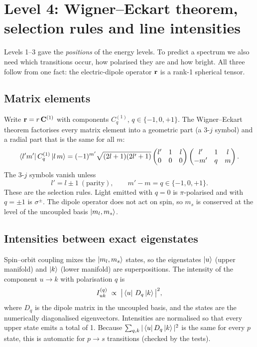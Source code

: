 \section{Level 4: Wigner--Eckart theorem, selection rules and line intensities}
Levels 1--3 gave the \emph{positions} of the energy levels. To predict a spectrum we also need
which transitions occur, how polarised they are and how bright. All three follow from one fact:
the electric-dipole operator $\vb{r}$ is a rank-1 spherical tensor.

\subsection{Matrix elements}
Write $\vb{r} = r\,\vb{C}^{(1)}$ with components $C^{(1)}_q$, $q\in\{-1,0,+1\}$. The
Wigner--Eckart theorem factorises every matrix element into a geometric part (a 3-$j$ symbol) and a
radial part that is the same for all $m$:
\begin{equation}
  \bra{l'm'} C^{(1)}_q \ket{l\,m}
  = (-1)^{m'}\sqrt{(2l+1)(2l'+1)}
    \begin{pmatrix} l' & 1 & l\\ 0 & 0 & 0\end{pmatrix}
    \begin{pmatrix} l' & 1 & l\\ -m' & q & m\end{pmatrix}.
\end{equation}
The 3-$j$ symbols vanish unless
\begin{equation}
  l' = l\pm1 \ (\text{parity}),\qquad m' - m = q \in\{-1,0,+1\}.
\end{equation}
These are the selection rules. Light emitted with $q=0$ is $\pi$-polarised and with $q=\pm1$ is
$\sigma^\pm$. The dipole operator does not act on spin, so $m_s$ is conserved at the level of the
uncoupled basis $\ket{m_l,m_s}$.

\subsection{Intensities between exact eigenstates}
Spin--orbit coupling mixes the $\ket{m_l,m_s}$ states, so the eigenstates $\ket{u}$ (upper
manifold) and $\ket{k}$ (lower manifold) are superpositions. The intensity of the component
$u\to k$ with polarisation $q$ is
\begin{equation}
  I_{uk}^{(q)} \;\propto\; \big|\bra{u}\, D_q \ket{k}\big|^2,
\end{equation}
where $D_q$ is the dipole matrix in the uncoupled basis, and the states are the numerically
diagonalised eigenvectors. Intensities are normalised so that every upper state emits a total of 1.
Because $\sum_{q,k}|\bra{u}D_q\ket{k}|^2$ is the same for every $p$ state, this is automatic for
$p\to s$ transitions (checked by the tests).

